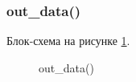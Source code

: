 \subsubsection{out\_data()}

Блок-схема на рисунке \ref{fig:out_data}.

\begin{figure}[p]
    \caption{out\_data()}
    \label{fig:out_data}
\end{figure}





\newpage